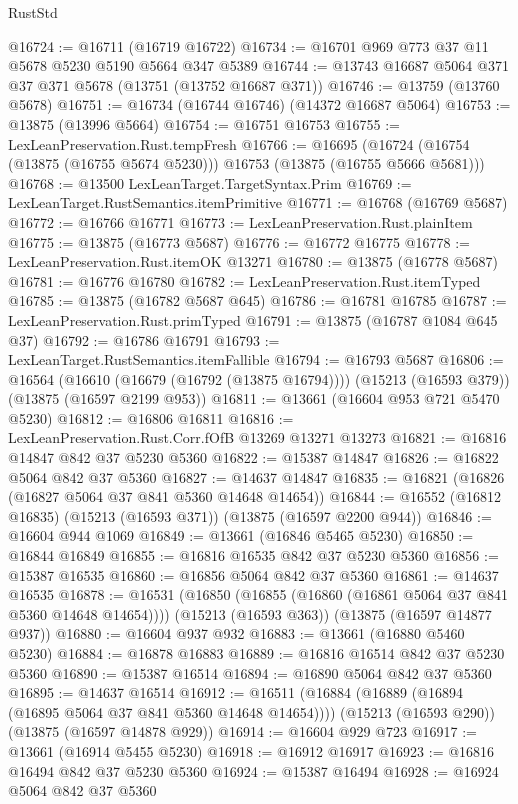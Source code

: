 \begin{lexlean}{RustStd}
\begin{coremodule}
@16724 := @16711 (@16719 @16722)
@16734 := @16701 @969 @773 @37 @11 @5678 @5230 @5190 @5664 @347 @5389
@16744 := @13743 @16687 @5064 @371 @37 @371 @5678 (@13751 (@13752 @16687 @371))
@16746 := @13759 (@13760 @5678)
@16751 := @16734 (@16744 @16746) (@14372 @16687 @5064)
@16753 := @13875 (@13996 @5664)
@16754 := @16751 @16753
@16755 := LexLeanPreservation.Rust.tempFresh
@16766 := @16695
    (@16724 (@16754 (@13875 (@16755 @5674 @5230))) @16753 (@13875 (@16755 @5666 @5681)))
@16768 := @13500 LexLeanTarget.TargetSyntax.Prim
@16769 := LexLeanTarget.RustSemantics.itemPrimitive
@16771 := @16768 (@16769 @5687)
@16772 := @16766 @16771
@16773 := LexLeanPreservation.Rust.plainItem
@16775 := @13875 (@16773 @5687)
@16776 := @16772 @16775
@16778 := LexLeanPreservation.Rust.itemOK @13271
@16780 := @13875 (@16778 @5687)
@16781 := @16776 @16780
@16782 := LexLeanPreservation.Rust.itemTyped
@16785 := @13875 (@16782 @5687 @645)
@16786 := @16781 @16785
@16787 := LexLeanPreservation.Rust.primTyped
@16791 := @13875 (@16787 @1084 @645 @37)
@16792 := @16786 @16791
@16793 := LexLeanTarget.RustSemantics.itemFallible
@16794 := @16793 @5687
@16806 := @16564
    (@16610 (@16679 (@16792 (@13875 @16794))))
    (@15213 (@16593 @379))
    (@13875 (@16597 @2199 @953))
@16811 := @13661 (@16604 @953 @721 @5470 @5230)
@16812 := @16806 @16811
@16816 := LexLeanPreservation.Rust.Corr.fOfB @13269 @13271 @13273
@16821 := @16816 @14847 @842 @37 @5230 @5360
@16822 := @15387 @14847
@16826 := @16822 @5064 @842 @37 @5360
@16827 := @14637 @14847
@16835 := @16821 (@16826 (@16827 @5064 @37 @841 @5360 @14648 @14654))
@16844 := @16552 (@16812 @16835) (@15213 (@16593 @371)) (@13875 (@16597 @2200 @944))
@16846 := @16604 @944 @1069
@16849 := @13661 (@16846 @5465 @5230)
@16850 := @16844 @16849
@16855 := @16816 @16535 @842 @37 @5230 @5360
@16856 := @15387 @16535
@16860 := @16856 @5064 @842 @37 @5360
@16861 := @14637 @16535
@16878 := @16531
    (@16850 (@16855 (@16860 (@16861 @5064 @37 @841 @5360 @14648 @14654))))
    (@15213 (@16593 @363))
    (@13875 (@16597 @14877 @937))
@16880 := @16604 @937 @932
@16883 := @13661 (@16880 @5460 @5230)
@16884 := @16878 @16883
@16889 := @16816 @16514 @842 @37 @5230 @5360
@16890 := @15387 @16514
@16894 := @16890 @5064 @842 @37 @5360
@16895 := @14637 @16514
@16912 := @16511
    (@16884 (@16889 (@16894 (@16895 @5064 @37 @841 @5360 @14648 @14654))))
    (@15213 (@16593 @290))
    (@13875 (@16597 @14878 @929))
@16914 := @16604 @929 @723
@16917 := @13661 (@16914 @5455 @5230)
@16918 := @16912 @16917
@16923 := @16816 @16494 @842 @37 @5230 @5360
@16924 := @15387 @16494
@16928 := @16924 @5064 @842 @37 @5360

\end{coremodule}
\end{lexlean}
